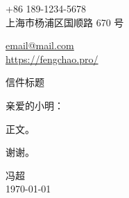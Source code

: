 \documentclass[a4paper]{letter}
\makeatletter
\newcommand{\lettertitle}{信件标题}
\newcommand{\yourphone}{+86 189-1234-5678}
\newcommand{\youraddress}{上海市杨浦区国顺路 670 号}
\newcommand{\youremail}{email@mail.com}
\newcommand{\yourweb}{https://fengchao.pro/}
\makeatother
\begin{document}
\begin{flushleft}
    \yourphone\\
    \youraddress
\end{flushleft}

\vspace{-46pt}

\begin{flushright}
    \href{mailto:\youremail}{\youremail}\\
    \href{\yourweb}{\yourweb}
\end{flushright}

\begin{center}
    \LARGE\lettertitle
\end{center}

\bigskip

\par \noindent 亲爱的小明：
\par 正文。
\par 谢谢。

\par \begin{flushright}
    冯超\\
    \today
\end{flushright}
\end{document}
